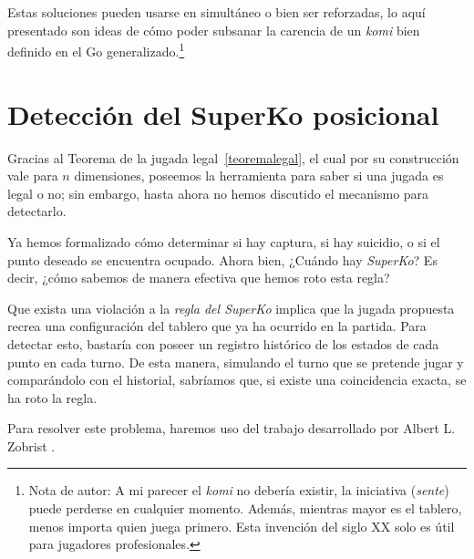 Estas soluciones pueden usarse en simultáneo o bien ser reforzadas, lo aquí presentado son ideas de cómo poder subsanar la carencia de un \textit{komi} bien definido en el Go generalizado.\footnote{Nota de autor: A mi parecer el \textit{komi} no debería existir, la iniciativa (\textit{sente}) puede perderse en cualquier momento. Además, mientras mayor es el tablero, menos importa quien juega primero. Esta invención del siglo XX solo es útil para jugadores profesionales.}

\section{Detección del SuperKo posicional}\label{detec_superko}

Gracias al Teorema de la jugada legal~\ref{teoremalegal}, el cual por su construcción vale para $n$ dimensiones, poseemos la herramienta para saber si una jugada es legal o no; sin embargo, hasta ahora no hemos discutido el mecanismo para detectarlo.

Ya hemos formalizado cómo determinar si hay captura, si hay suicidio, o si el punto deseado se encuentra ocupado. Ahora bien, ¿Cuándo hay \textit{SuperKo}? Es decir, ¿cómo sabemos de manera efectiva que hemos roto esta regla?

Que exista una violación a la \textit{regla del SuperKo} implica que la jugada propuesta recrea una configuración del tablero que ya ha ocurrido en la partida. Para detectar esto, bastaría con poseer un registro histórico de los estados de cada punto en cada turno. De esta manera, simulando el turno que se pretende jugar y comparándolo con el historial, sabríamos que, si existe una coincidencia exacta, se ha roto la regla.

Para resolver este problema, haremos uso del trabajo desarrollado por Albert L. Zobrist \cite{zobrist1970hashing}. 



